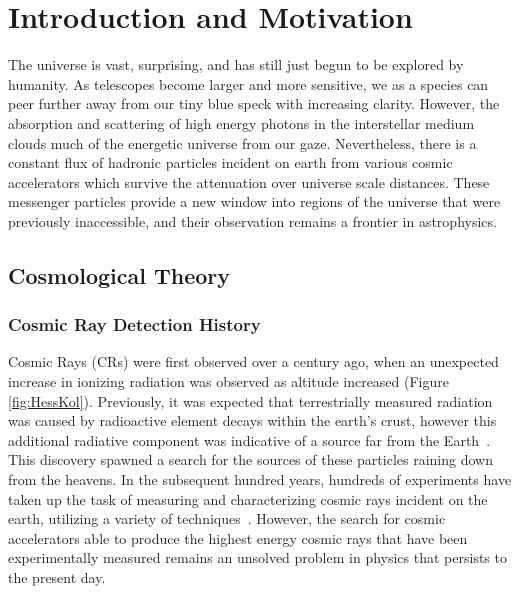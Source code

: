 
\chapter{Introduction and Motivation}
		The universe is vast, surprising, and has still just begun to be explored by humanity.  As telescopes become larger and more sensitive, we as a species can peer further away from our tiny blue speck with increasing clarity.  However, the absorption and scattering of high energy photons in the interstellar medium clouds much of the energetic universe from our gaze.  Nevertheless, there is a constant flux of hadronic particles incident on earth from various cosmic accelerators which survive the attenuation over universe scale distances.  These messenger particles provide a new window into regions of the universe that were previously inaccessible, and their observation remains a frontier in astrophysics.
\section{Cosmological Theory}
	\subsection{Cosmic Ray Detection History}
	Cosmic Rays (CRs) were first observed over a century ago, when an unexpected increase in ionizing radiation was observed as altitude increased (Figure \ref{fig:HessKol}).  Previously, it was expected that terrestrially measured radiation was caused by radioactive element decays within the earth's crust, however this additional radiative component was indicative of a source far from the Earth~\cite{HessCosmicRay}.  This discovery spawned a search for the sources of these particles raining down from the heavens.  In the subsequent hundred years, hundreds of experiments have taken up the task of measuring and characterizing cosmic rays incident on the earth, utilizing a variety of techniques~\cite{Olive:2016xmw}.  However, the search for cosmic accelerators able to produce the highest energy cosmic rays that have been experimentally measured remains an unsolved problem in physics that persists to the present day. 
	
